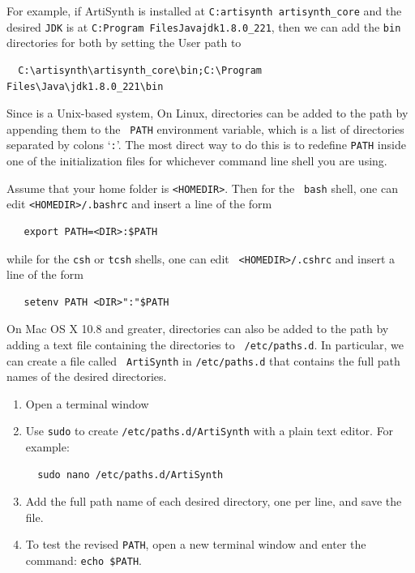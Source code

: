 For example, if ArtiSynth is installed at {\tt C:\BKS artisynth\BKS
artisynth\_core} and the desired {\tt JDK} is at {\tt C:\BKS Program
Files\BKS Java\BKS jdk1.8.0\_221}, then we can add the {\tt bin}
directories for both by setting the User path to
\begin{verbatim}
  C:\artisynth\artisynth_core\bin;C:\Program Files\Java\jdk1.8.0_221\bin
\end{verbatim}

\fi %

\ifWindows\else %

\ifMacOS
Since \SYSTEM{} is a Unix-based system, 
\else\ifLinux
On Linux,
\fi %
\fi %
directories can be added to the path by appending them to the {\tt
PATH} environment variable, which is a list of directories separated
by colons `{\tt :}'. The most direct way to do this is to redefine
{\tt PATH} inside one of the initialization files for whichever
command line shell you are using.

Assume that your home folder is {\tt <HOMEDIR>}. Then for the {\tt
bash} shell, one can edit {\tt <HOMEDIR>/.bashrc} and insert a line of
the form
\begin{verbatim}
   export PATH=<DIR>:$PATH
\end{verbatim}
while for the {\tt csh} or {\tt tcsh} shells, one can edit {\tt
<HOMEDIR>/.cshrc} and insert a line of the form
\begin{verbatim}
   setenv PATH <DIR>":"$PATH
\end{verbatim}

\ifMacOS
On Mac OS X 10.8 and greater, directories can also be added to the
path by adding a text file containing the directories to {\tt
/etc/paths.d}.  In particular, we can create a file called {\tt
ArtiSynth} in {\tt /etc/paths.d} that contains the full path names of
the desired directories.

\begin{enumerate}

\item Open a terminal window

\item Use {\tt sudo} to create {\tt /etc/paths.d/ArtiSynth} with a plain
text editor. For example:
\begin{verbatim}
  sudo nano /etc/paths.d/ArtiSynth
\end{verbatim}

\item Add the full path name of each desired directory, one per line,
and save the file.

\item To test the revised {\tt PATH}, open a new terminal
window and enter the command: {\tt echo \$PATH}.

\end{enumerate}


